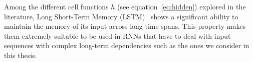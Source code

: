 Among the different cell functions $h$ (see equation~\eqref{eq:hidden}) explored in the literature, Long Short-Term
Memory (LSTM)~\cite{hochreiter1997long} shows a significant ability to maintain the memory of its input across long time spans. This property makes them extremely suitable to be used in RNNs that have to deal with input sequences with complex long-term dependencies such as the ones we consider in this thesis.


